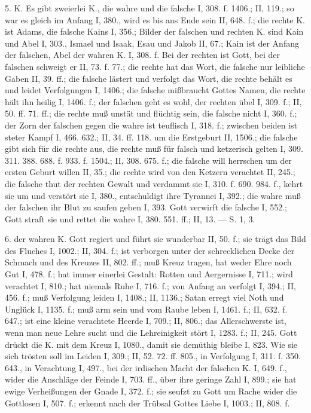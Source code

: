 5.  K. Es gibt zweierlei K., die wahre und die falsche I, 308. f. 1406.; II, 119.; so war es gleich im Anfang I, 380., wird es bis ans Ende sein II, 648. f.; die rechte K. ist Adams, die falsche Kains I, 356.; Bilder der falschen und rechten K. sind Kain und Abel I, 303., Ismael und Isaak, Esau und Jakob II, 67.; Kain ist der Anfang der falschen, Abel der wahren K. I, 308. f. Bei der rechten ist Gott, bei der falschen schweigt er II, 73. f. 77.; die rechte hat das Wort, die falsche nur leibliche Gaben II, 39. ff.; die falsche lästert und verfolgt das Wort, die rechte behält es und leidet Verfolgungen I, 1406.; die falsche mißbraucht Gottes Namen, die rechte hält ihn heilig I, 1406. f.; der falschen geht es wohl, der rechten übel I, 309. f.; II, 50. ff. 71. ff.; die rechte muß unstät und flüchtig sein, die falsche nicht I, 360. f.; der Zorn der falschen gegen die wahre ist teuflisch I, 318. f.; zwischen beiden ist steter Kampf I, 466. 632.; II, 34. ff. 118. um die Erstgeburt II, 1506.; die falsche gibt sich für die rechte aus, die rechte muß für falsch und ketzerisch gelten I, 309. 311. 388. 688. f. 933. f. 1504.; II, 308. 675. f.; die falsche will herrschen um der ersten Geburt willen II, 35.; die rechte wird von den Ketzern verachtet II, 245.; die falsche thut der rechten Gewalt und verdammt sie I, 310. f. 690. 984. f., kehrt sie um und verstört sie I, 380., entschuldigt ihre Tyrannei I, 392.; die wahre muß der falschen ihr Blut zu saufen geben I, 393. Gott verwirft die falsche I, 552.; Gott straft sie und rettet die wahre I, 380. 551. ff.; II, 13. — S.  1,  3.

6.  der wahren K. Gott regiert und führt sie wunderbar II, 50. f.; sie trägt das Bild des Fluches I, 1002.; II, 304. f.; ist verborgen unter der schrecklichen Decke der Schmach und des Kreuzes II, 802. ff.; muß Kreuz tragen, hat weder Ehre noch Gut I, 478. f.; hat immer einerlei Gestalt: Rotten und Aergernisse I, 711.; wird verachtet I, 810.; hat niemals Ruhe I, 716. f.; von Anfang an verfolgt I, 394.; II, 456. f.; muß Verfolgung leiden I, 1408.; II, 1136.; Satan erregt viel Noth und Unglück I, 1135. f.; muß arm sein und vom Raube leben I, 1461. f.; II, 632. f. 647.; ist eine kleine verachtete Heerde I, 709.; II, 806.; das Allerschwerste ist, wenn man neue Lehre sucht und die Lehreinigkeit stört I, 1283. f.; II, 245. Gott drückt die K. mit dem Kreuz I, 1080., damit sie demüthig bleibe I, 823. Wie sie sich trösten soll im Leiden I, 309.; II, 52. 72. ff. 805., in Verfolgung I, 311. f. 350. 643., in Verachtung I, 497., bei der irdischen Macht der falschen K. I, 649. f., wider die Anschläge der Feinde I, 703. ff., über ihre geringe Zahl I, 899.; sie hat ewige Verheißungen der Gnade I, 372. f.; sie seufzt zu Gott um Rache wider die Gottlosen I, 507. f.; erkennt nach der Trübsal Gottes Liebe I, 1003.; II, 808. f.


